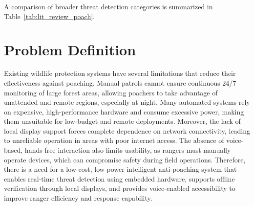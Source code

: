 \documentclass[11pt,a4paper,oneside]{report}
\begin{document}
A comparison of broader threat detection categories is summarized in Table~\ref{tab:lit_review_poach}.

\begin{table}[H]
\centering
\caption{Comparative Survey of Existing Forest Threat Detection Approaches}
\label{tab:lit_review_poach}
\end{table}

\section{Problem Definition}
Existing wildlife protection systems have several limitations that reduce their effectiveness against poaching. Manual patrols cannot ensure continuous 24/7 monitoring of large forest areas, allowing poachers to take advantage of unattended and remote regions, especially at night. Many automated systems rely on expensive, high-performance hardware and consume excessive power, making them unsuitable for low-budget and remote deployments. Moreover, the lack of local display support forces complete dependence on network connectivity, leading to unreliable operation in areas with poor internet access. The absence of voice-based, hands-free interaction also limits usability, as rangers must manually operate devices, which can compromise safety during field operations. Therefore, there is a need for a low-cost, low-power intelligent anti-poaching system that enables real-time threat detection using embedded hardware, supports offline verification through local displays, and provides voice-enabled accessibility to improve ranger efficiency and response capability.
\end{document}
